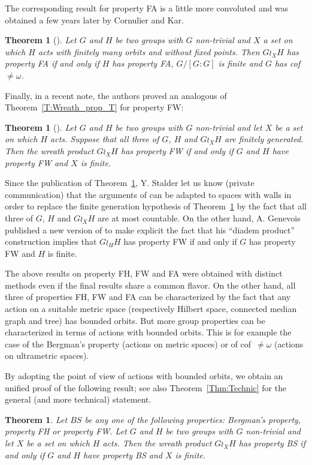 \documentclass[a4paper]{article}
\newtheorem{thm}[lem]{Theorem}
\theoremstyle{definition}
\begin{document}
The corresponding result for property FA is a little more convoluted and was obtained a few years later by Cornulier and Kar.
%
%
\begin{thm}[\cite{Cornulier2011}]\label{Thm:FACK}
Let $G$ and $H$ be two groups with $G$ non-trivial and $X$ a set on which $H$ acts with finitely many orbits and without fixed points.
Then $G\wr_XH$ has property FA if and only if $H$ has property FA, $G/[G:G]$ is finite and $G$ has cof~$\neq\omega$.
\end{thm}
%
%
Finally, in a recent note, the authors proved an analogous of Theorem~\ref{T:Wreath_prop_T} for property FW:
%
%
\begin{thm}[\cite{LS2020}]\label{Thm:PropFW}
Let $G$ and $H$ be two groups with $G$ non-trivial and let $X$ be a set on which $H$ acts. Suppose that all three of $G$, $H$ and $G\wr_XH$ are finitely generated. Then the wreath product $G \wr_X H$ has property FW if and only if $G$ and $H$ have property FW and $X$ is finite.
\end{thm}
%
%
Since the publication of Theorem~\ref{Thm:PropFW}, Y. Stalder let us know (private communication) that the arguments of \cite{LS2020} can be adapted to spaces with walls in order to replace the finite generation hypothesis of Theorem~\ref{Thm:PropFW} by the fact that all three of $G$, $H$ and $G\wr_XH$ are at most countable.
On the other hand, A. Genevois published a new version of \cite{2017arXiv170500834G} to make explicit the fact that his ``diadem product'' construction implies that $G\wr_HH$ has property FW if and only if $G$ has property FW and $H$ is finite.

The above results on property FH, FW and FA were obtained with distinct methods even if the final results share a common flavor.
On the other hand, all three of properties FH, FW and FA can be characterized by the fact that any action on a suitable metric space (respectively Hilbert space, connected median graph and tree) has bounded orbits.
But more group properties can be characterized in terms of actions with bounded orbits. This is for example the case of the Bergman's property (actions on metric spaces) or of cof~$\neq\omega$ (actions on ultrametric spaces).

By adopting the point of view of actions with bounded orbits, we obtain an unified proof of the following result; see also Theorem~\ref{Thm:Technic} for the general (and more technical) statement.
%
%
\begin{thm}\label{Thm:Main}
Let $BS$ be any one of the following properties: Bergman's property, property FH or property FW.
Let $G$ and $H$ be two groups with $G$ non-trivial and let $X$ be a set on which $H$ acts. Then the wreath product $G \wr_X H$ has property BS if and only if $G$ and $H$ have property BS and $X$ is finite.
\end{thm}
\end{document}
